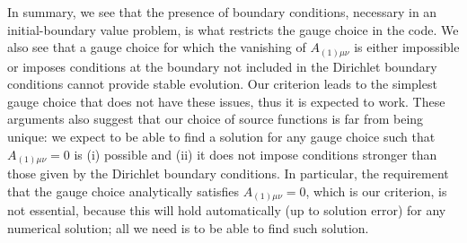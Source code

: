 \documentclass[a4paper,11pt]{article}
\begin{document}
In summary, we see that the presence of boundary conditions, necessary in an initial-boundary value problem, is what restricts the gauge choice in the code. We also see that a gauge choice for which the vanishing of $A_{(1)\mu\nu}$ is either impossible or imposes conditions at the boundary not included in the Dirichlet boundary conditions cannot provide stable evolution.
Our criterion leads to the simplest gauge choice that does not have these issues, thus it is expected to work. These arguments also suggest that our choice of source functions is far from being unique: we expect to be able to find a solution for any gauge choice such that $A_{(1)\mu\nu}=0$ is (i) possible and (ii) it does not impose conditions stronger than those given by the Dirichlet boundary conditions. In particular, the requirement that the gauge choice analytically satisfies $A_{(1)\mu\nu}=0$, which is our criterion, is not essential, because this will hold automatically (up to solution error) for any numerical solution; all we need is to be able to find such solution.


\end{document}
